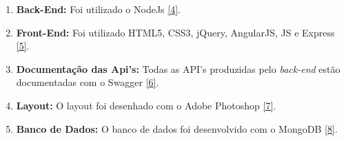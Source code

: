
\begin{enumerate}
\item \textbf{Back-End:} Foi utilizado o NodeJs \hyperref[nodejs]{[4]}.
\item \textbf{Front-End:} Foi utilizado HTML5, CSS3, jQuery, AngularJS, JS e Express \hyperref[express]{[5]}.
\item \textbf{Documentação das Api's:} Todas as API's produzidas pelo \textit{back-end} estão documentadas com o Swagger \hyperref[swagger]{[6]}.
\item \textbf{Layout:} O layout foi desenhado com o Adobe Photoshop \hyperref[ps]{[7]}.
\item \textbf{Banco de Dados:} O banco de dados foi desenvolvido com o MongoDB \hyperref[mongodb]{[8]}.

\end{enumerate}